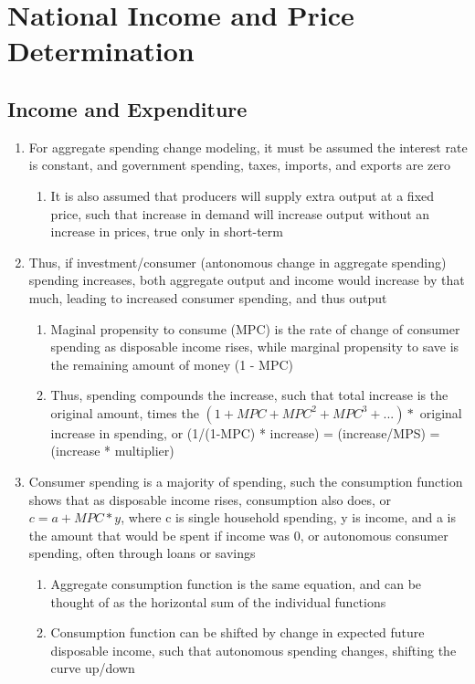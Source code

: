 \documentclass[11 pt, twoside]{article}
\begin{document}
\section{National Income and Price Determination}
\subsection{Income and Expenditure}
\begin{enumerate}
\item For aggregate spending change modeling, it must be assumed the interest rate is constant, and government spending, taxes, imports, and exports are zero
\begin{enumerate}
\item It is also assumed that producers will supply extra output at a fixed price, such that increase in demand will increase output without an increase in prices, true only in short-term
\end{enumerate}
\item Thus, if investment/consumer (antonomous change in aggregate spending) spending increases, both aggregate output and income would increase by that much, leading to increased consumer spending, and thus output
\begin{enumerate}
\item Maginal propensity to consume (MPC) is the rate of change of consumer spending as disposable income rises, while marginal propensity to save is the remaining amount of money (1 - MPC)
\item Thus, spending compounds the increase, such that total increase is the original amount, times the $(1 + MPC + MPC^2 + MPC^3 + ...) *$ original increase in spending, or (1/(1-MPC) * increase) = (increase/MPS) = (increase * multiplier)
\end{enumerate}
\item Consumer spending is a majority of spending, such the consumption function shows that as disposable income rises, consumption also does, or $c = a + MPC * y$, where c is single household spending, y is income, and a is the amount that would be spent if income was 0, or autonomous consumer spending, often through loans or savings
\begin{enumerate}
\item Aggregate consumption function is the same equation, and can be thought of as the horizontal sum of the individual functions
\item Consumption function can be shifted by change in expected future disposable income, such that autonomous spending changes, shifting the curve up/down

\end{enumerate}
\end{enumerate}
\end{document}
